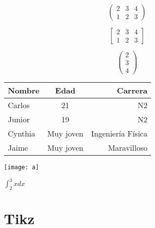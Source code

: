 \documentclass[a4paper,12pt]{article}
\theoremstyle{theorem}
\theoremstyle{definition}
\begin{document}
\[   \begin{pmatrix}
2 & 3 & 4 \\ 
1 & 2 & 3
\end{pmatrix}   \]

\[   \begin{bmatrix}
2 & 3 & 4 \\ 
1 & 2 & 3
\end{bmatrix}   \]

\[   \begin{pmatrix}
2  \\  3 \\ 4 
\end{pmatrix}   \]

\begin{tabular}{||l|c|r||}
	\hline Nombre & Edad & Carrera \\ 
	\hline Carlos & 21 & N2 \\ 
	\hline Junior & 19 & N2 \\ 
	\hline Cynthia & Muy joven & Ingeniería Física \\ 
	\hline Jaime & Muy joven & Maravilloso \\ 
	\hline\hline
\end{tabular} 
 
\begin{center}
	\texttt{[image: a]}
\end{center}
\( {\int }_{2}^{3}xdx \)%

\section{Tikz}
\end{document}
